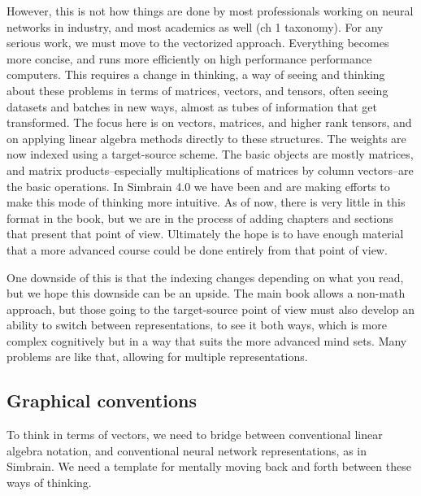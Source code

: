 However, this is not how things are done by most professionals working on neural networks in industry, and most academics as well (ch 1 taxonomy). For any serious work, we must move to the vectorized approach. Everything becomes more concise, and runs more efficiently on high performance performance computers. This requires a change in thinking, a way of seeing and thinking about these problems in terms of matrices, vectors, and tensors, often seeing datasets and batches in new ways, almost as tubes of information that get transformed. The focus here is on vectors, matrices, and higher rank tensors, and on applying linear algebra methods directly to these structures. The weights are now indexed using a target-source scheme. The basic objects are mostly matrices, and matrix products--especially multiplications of matrices by column vectors--are the basic operations. In Simbrain 4.0 we have been and are making efforts to make this mode of thinking more intuitive. As of now, there is very little in this format in the book, but we are in the process of adding chapters and sections that present that point of view. Ultimately the hope is to have enough material that a more advanced course could be done entirely from that point of view.

One downside of this is that the indexing changes depending on what you read, but we hope this downside can be an upside. The main book allows a non-math approach, but those going to the target-source point of view must also develop an ability to switch between representations, to see it both ways, which is more complex cognitively but in a way that suits the more advanced mind sets. Many problems are like that, allowing for multiple representations.


\subsection{Graphical conventions}

To think in terms of vectors, we need to bridge between conventional linear algebra notation, and conventional neural network representations, as in Simbrain.  We need a template for mentally moving back and forth between these ways of thinking.  

